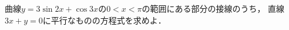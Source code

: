 \documentclass[../../main.tex]{subfiles}
\begin{document}
曲線$y=3\sin 2x+\cos 3x$の$0<x<\pi$の範囲にある部分の接線のうち，
直線$3x+y=0$に平行なものの方程式を求めよ．
\end{document}
